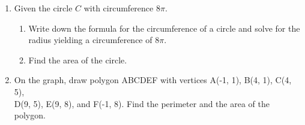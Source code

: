 \documentclass[12pt, oneside]{article}
\begin{document}
\begin{enumerate}
\newpage

  \item Given the circle $C$ with circumference $8\pi$.
  \begin{enumerate}
    \item Write down the formula for the circumference of a circle and solve for the radius yielding a circumference of $8\pi$. \vspace{1cm}
    \item Find the area of the circle.
  \end{enumerate}

  \item On the graph, draw polygon ABCDEF with vertices A(-1, 1), B(4, 1),
  C(4, 5), \\ D(9, 5), E(9, 8), and F(-1, 8). Find the perimeter and the area of the polygon.\\[1cm]
  \vspace{2cm}



  \end{enumerate}
\end{document}
